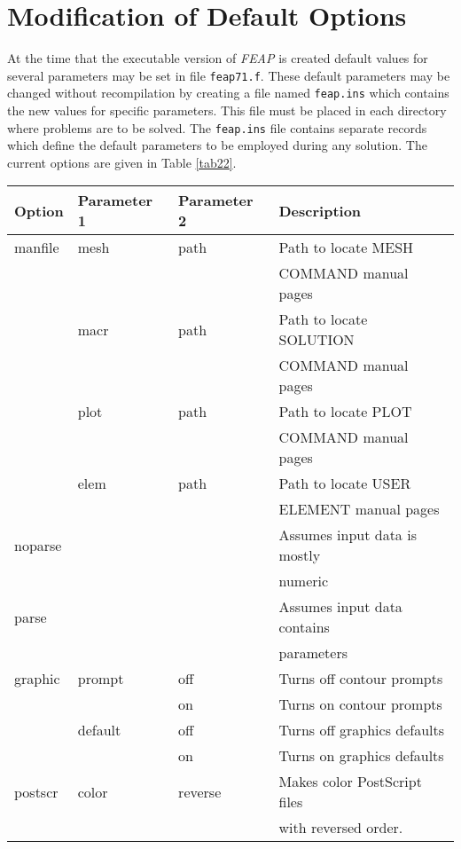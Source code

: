 \section{Modification of Default Options}

At the time that the executable version of {\sl FEAP} is created
default values for several parameters may be set in file {\tt feap71.f}.
These default parameters may be changed without recompilation
by creating a file named {\tt feap.ins} which contains the new values for
specific parameters.  This file must be placed in each directory where
problems are to be solved.  The {\tt feap.ins} file contains separate records
which define the default parameters to be employed during any solution.  The
current options are given in Table \ref{tab22}.

\begin{table}
\begin{center}
\begin{tabular}{l l l |  l}
Option & Parameter 1 & Parameter 2 & Description \\ \hline
manfile & mesh & path & Path to locate MESH \\
 & & & COMMAND manual pages \\
        & macr & path & Path to locate SOLUTION \\
 & & & COMMAND manual pages \\
        & plot & path & Path to locate PLOT \\
 & & & COMMAND manual pages \\
        & elem & path & Path to locate USER \\
 & & & ELEMENT manual pages \\ \hline
noparse & & & Assumes input data is mostly \\
 & & & numeric  \\
parse & & & Assumes input data contains \\
 & & & parameters  \\ \hline
graphic & prompt & off & Turns off contour prompts \\
        &        & on  & Turns on contour prompts \\
        & default & off & Turns off graphics defaults \\
        &         & on  & Turns on graphics defaults \\ \hline
postscr & color & reverse & Makes color PostScript files \\
 & & & with reversed order. \\

\end{tabular}
\end{center}
\end{table}
